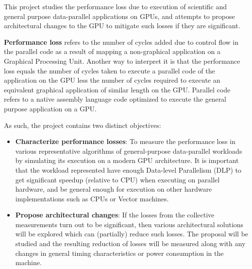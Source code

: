 
\par{
This project studies the performance loss due to execution of scientific and general purpose data-parallel applications on GPUs, and attempts to propose architectural changes to the GPU to mitigate such losses if they are significant.}

\par{\textbf{Performance loss} refers to the number of cycles added due to control flow in the parallel code as a result of mapping a non-graphical application on a Graphical Processing Unit. Another way to interpret it is that the performance loss equals the number of cycles taken to execute a parallel code of the application on the GPU less the number of cycles required to execute an equivalent graphical application of similar length on the GPU. Parallel code refers to a native assembly language code optimized to execute the general purpose application on a GPU.
}

As such, the project contains two distinct objectives:
\begin{itemize}
\item \textbf{Characterize performance losses}: To measure the performance loss in various representative algorithms of general-purpose data-parallel workloads by simulating its execution on a modern GPU architecture. It is important that the workload represented have enough Data-level Parallelism (DLP) to get significant speedup (relative to CPU) when executing on parallel hardware, and be general enough for execution on other hardware implementations such as CPUs or Vector machines. 
\item \textbf{Propose architectural changes}: If the losses from the collective measurements turn out to be significant, then various architectural solutions will be explored which can (partially) reduce such losses. The proposal will be studied and the resulting reduction of losses will be measured along with any changes in general timing characteristics or power consumption in the machine.
\end{itemize}
